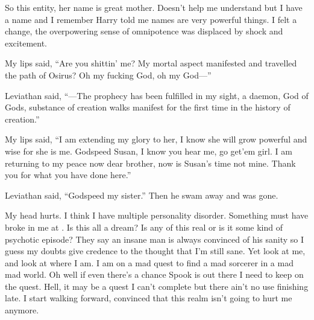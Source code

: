 So this entity, her name is great mother. Doesn't help me understand but I have a name and I remember Harry told me names are very powerful things. I felt a change, the overpowering sense of omnipotence was displaced by shock and excitement.

My lips said, ``Are you shittin' me? My mortal aspect manifested and travelled the path of Osirus? Oh my fucking God, oh my God---''

Leviathan said, ``---The prophecy has been fulfilled in my sight, a daemon, God of Gods, substance of creation walks manifest for the first time in the history of creation.''

My lips said, ``I am extending my glory to her, I know she will grow powerful and wise for she is me. Godspeed Susan, I know you hear me, go get'em girl. I am returning to my peace now dear brother, now is Susan's time not mine. Thank you for what you have done here.''

Leviathan said, ``Godspeed my sister.'' Then he swam away and was gone.

\parasep

My head hurts. I think I have multiple personality disorder. Something must have broke in me at \chichenitza*. Is this all a dream? Is any of this real or is it some kind of psychotic episode? They say an insane man is always convinced of his sanity so I guess my doubts give credence to the thought that I'm still sane. Yet look at me, and look at where I am. I am on a mad quest to find a mad sorcerer in a mad mad world. Oh well if even there's a chance Spook is out there I need to keep on the quest. Hell, it may be a quest I can't complete but there ain't no use finishing late. I start walking forward, convinced that this realm isn't going to hurt me anymore.





